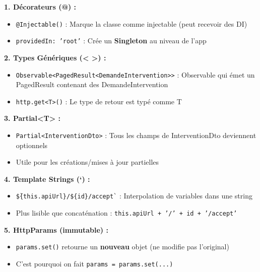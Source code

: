 \documentclass[12pt,a4paper]{article}
\begin{document}
\begin{infobox}[title={\faLightbulb\ Concepts TypeScript/Angular Expliqués}]
\textbf{1. Décorateurs (@) :}
\begin{itemize}
    \item \texttt{@Injectable()} : Marque la classe comme injectable (peut recevoir des DI)
    \item \texttt{providedIn: 'root'} : Crée un \textbf{Singleton} au niveau de l'app
\end{itemize}

\textbf{2. Types Génériques (< >) :}
\begin{itemize}
    \item \texttt{Observable<PagedResult<DemandeIntervention>>} : Observable qui émet un PagedResult contenant des DemandeIntervention
    \item \texttt{http.get<T>()} : Le type de retour est typé comme T
\end{itemize}

\textbf{3. Partial<T> :}
\begin{itemize}
    \item \texttt{Partial<InterventionDto>} : Tous les champs de InterventionDto deviennent optionnels
    \item Utile pour les créations/mises à jour partielles
\end{itemize}

\textbf{4. Template Strings (`) :}
\begin{itemize}
    \item \texttt{\`\$\{this.apiUrl\}/\$\{id\}/accept\`} : Interpolation de variables dans une string
    \item Plus lisible que concaténation : \texttt{this.apiUrl + '/' + id + '/accept'}
\end{itemize}

\textbf{5. HttpParams (immutable) :}
\begin{itemize}
    \item \texttt{params.set()} retourne un \textbf{nouveau} objet (ne modifie pas l'original)
    \item C'est pourquoi on fait \texttt{params = params.set(...)}
\end{itemize}
\end{infobox}

\newpage

\end{document}
